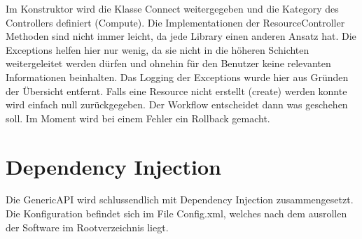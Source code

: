 \documentclass[11pt]{scrartcl}
\begin{document}
Im Konstruktor wird die Klasse Connect weitergegeben und die Kategory des Controllers definiert (Compute). Die Implementationen der ResourceController Methoden sind nicht immer leicht, da jede Library einen anderen Ansatz hat. Die Exceptions helfen hier nur wenig, da sie nicht in die höheren Schichten weitergeleitet werden dürfen und ohnehin für den Benutzer keine relevanten Informationen beinhalten. Das Logging der Exceptions wurde hier aus Gründen der Übersicht entfernt. Falls eine Resource nicht erstellt (create) werden konnte wird einfach null zurückgegeben. Der Workflow entscheidet dann was geschehen soll. Im Moment wird bei einem Fehler ein Rollback gemacht.

\section{Dependency Injection}
Die GenericAPI wird schlussendlich mit Dependency Injection zusammengesetzt. Die Konfiguration befindet sich im File Config.xml, welches nach dem ausrollen der Software im Rootverzeichnis liegt.
\end{document}
